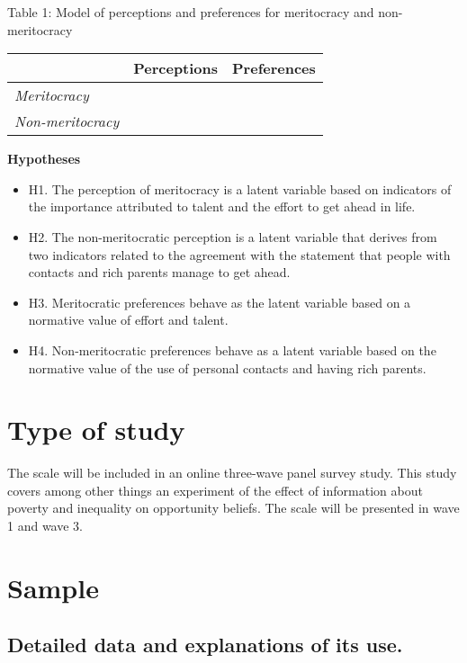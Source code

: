 \documentclass[
]{article}
\providecommand{\tightlist}{%
  \setlength{\itemsep}{0pt}\setlength{\parskip}{0pt}}
\begin{document}
Table 1: Model of perceptions and preferences for meritocracy and
non-meritocracy

\begin{longtable}[]{@{}lll@{}}
\toprule
& Perceptions & Preferences\tabularnewline
\midrule
\endhead
\emph{Meritocracy} & &\tabularnewline
\emph{Non-meritocracy} & &\tabularnewline
\bottomrule
\end{longtable}

\textbf{Hypotheses}

\begin{itemize}
\tightlist
\item
  H1. The perception of meritocracy is a latent variable based on
  indicators of the importance attributed to talent and the effort to
  get ahead in life.
\item
  H2. The non-meritocratic perception is a latent variable that derives
  from two indicators related to the agreement with the statement that
  people with contacts and rich parents manage to get ahead.
\item
  H3. Meritocratic preferences behave as the latent variable based on a
  normative value of effort and talent.
\item
  H4. Non-meritocratic preferences behave as a latent variable based on
  the normative value of the use of personal contacts and having rich
  parents.
\end{itemize}

\hypertarget{type-of-study}{%
\section{Type of study}\label{type-of-study}}

The scale will be included in an online three-wave panel survey study.
This study covers among other things an experiment of the effect of
information about poverty and inequality on opportunity beliefs. The
scale will be presented in wave 1 and wave 3.

\hypertarget{sample}{%
\section{Sample}\label{sample}}

\hypertarget{detailed-data-and-explanations-of-its-use.}{%
\subsection{Detailed data and explanations of its
use.}\label{detailed-data-and-explanations-of-its-use.}}
\end{document}

